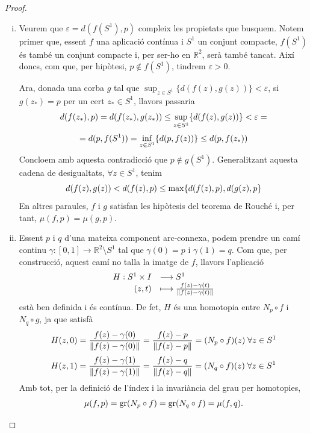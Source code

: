 \documentclass[../main.tex]{subfiles}
\begin{document}
\begin{proof}
\begin{enumerate}[(i)]
    \item Veurem que $\varepsilon = d(f(S^1),p)$ compleix les propietats que busquem. Notem primer que, essent $f$ una aplicació contínua i $S^1$ un conjunt compacte, $f(S^1)$ és també un conjunt compacte i, per ser-ho en $\mathbb{R}^2$, serà també tancat. Així doncs, com que, per hipòtesi, $p\not\in f(S^1)$, tindrem $\varepsilon>0$.

Ara, donada una corba $g$ tal que $\sup_{z\in S^1}\{d(f(z),g(z))\}<\varepsilon$, si $g(z_*) = p$ per un cert $z_*\in S^1$, llavors passaria
\begin{equation}
    \notag
    d(f(z_*),p) = d(f(z_*),g(z_*))\leq\sup_{z\in S^1}\{d(f(z),g(z))\}<\varepsilon =
\end{equation}
\begin{equation}
    \notag
    = d(p,f(S^1)) = \inf_{z\in S^1}\{d(p,f(z))\}\leq d(p,f(z_*))
\end{equation}
Concloem amb aquesta contradicció que $p\not\in g(S^1)$. Generalitzant aquesta cadena de desigualtats, $\forall z\in S^1$, tenim
\begin{equation}
    \notag
    d(f(z),g(z))<d(f(z),p)\leq \max\{d(f(z),p),d(g(z),p\}
\end{equation}
En altres paraules, $f$ i $g$ satisfan les hipòtesis del teorema de Rouché i, per tant, $\mu(f,p) = \mu(g,p)$.

\item Essent $p$ i $q$ d'una mateixa component arc-connexa, podem prendre un camí continu $\gamma:[0,1]\rightarrow \mathbb{R}^2\setminus S^1$ tal que $\gamma(0) = p$ i $\gamma(1) = q$. Com que, per construcció, aquest camí no talla la imatge de $f$, llavors l'aplicació
\begin{equation}
    \notag
    \begin{array}{rl}
        H:S^1\times I & \longrightarrow S^1 \\
        (z,t) & \longmapsto\frac{f(z)-\gamma(t)}{\|f(z)-\gamma(t)\|}
    \end{array}
\end{equation}
està ben definida i és contínua. De fet, $H$ és una homotopia entre $N_p\circ f$ i $N_q\circ g$, ja que satisfà 
\begin{equation}
    \notag
    H(z,0) = \frac{f(z)-\gamma(0)}{\|f(z)-\gamma(0)\|} = \frac{f(z)-p}{\|f(z)-p\|} = (N_p\circ f)(z)\;\forall z\in S^1 
\end{equation}
\begin{equation}
    \notag
    H(z,1) = \frac{f(z)-\gamma(1)}{\|f(z)-\gamma(1)\|} = \frac{f(z)-q}{\|f(z)-q\|}=(N_q\circ f)(z)\;\forall z\in S^1
\end{equation}
Amb tot, per la definició de l'índex i la invariància del grau per homotopies,
\begin{equation}
    \notag
    \mu(f,p) = \mathrm{gr}(N_p\circ f) = \mathrm{gr}(N_q\circ f) = \mu(f,q).
\end{equation}
\end{enumerate}
\end{proof}
\end{document}
